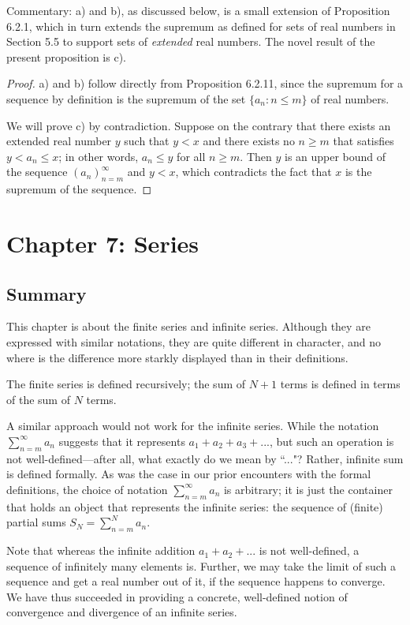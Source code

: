 \documentclass{article}
\begin{document}
Commentary: a) and b), as discussed below, is a small extension of Proposition 6.2.1, which in turn extends the supremum as defined for sets of real numbers in Section 5.5 to support sets of \textit{extended} real numbers. The novel result of the present proposition is c).

\begin{proof} a) and b) follow directly from Proposition 6.2.11, since the supremum for a sequence by definition is the supremum of the set $\{ a_n : n \leq m \}$ of real numbers.

We will prove c) by contradiction. Suppose on the contrary that there exists an extended real number $y$ such that $y < x$ and there exists no $n \geq m$ that satisfies $y < a_n \leq x$; in other words, $a_n \leq y$ for all $n \geq m$. Then $y$ is an upper bound of the sequence $(a_n)_{n=m}^\infty$ and $y < x$, which contradicts the fact that $x$ is the supremum of the sequence.
\end{proof}

\section*{Chapter 7: Series}
\subsection*{Summary}
This chapter is about the finite series and infinite series. Although they are expressed with similar notations, they are quite different in character, and no where is the difference more starkly displayed than in their definitions.

The finite series is defined recursively; the sum of $N+1$ terms is defined in terms of the sum of $N$ terms. 

A similar approach would not work for the infinite series. While the notation $\sum_{n=m}^\infty a_n$ suggests that it represents $a_1 + a_2 + a_3 + ...$, but such an operation is not well-defined---after all, what exactly do we mean by ``..."? Rather, infinite sum is defined formally. As was the case in our prior encounters with the formal definitions, the choice of  notation $\sum_{n=m}^\infty a_n$ is arbitrary; it is just the container that holds an object that represents the infinite series: the sequence of (finite) partial sums $S_N = \sum_{n=m}^N a_n$.

Note that whereas the infinite addition $a_1 + a_2 + ...$ is not well-defined, a sequence of infinitely many elements is. Further, we may take the limit of such a sequence and get a real number out of it, if the sequence happens to converge. We have thus succeeded in providing a concrete, well-defined notion of convergence and divergence of an infinite series.
\end{document}
